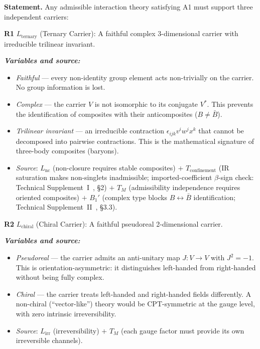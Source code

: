 \documentclass[11pt]{article}
\newenvironment{varlist}{\begin{itemize}[nosep,leftmargin=2em]}{\end{itemize}}
\begin{document}
\begin{tcolorbox}[apfbox, title={Theorem R: Representation Requirements from Admissibility}]
\textbf{Statement.}  Any admissible interaction theory satisfying A1 must support three independent carriers:

\medskip
\textbf{R1} $L_{\mathrm{ternary}}$ (Ternary Carrier): A faithful complex 3-dimensional carrier with irreducible trilinear invariant.

\smallskip\noindent\textbf{\textit{Variables and source:}}
\begin{varlist}
\item \textit{Faithful} --- every non-identity group element acts non-trivially on the carrier.  No group information is lost.
\item \textit{Complex} --- the carrier $V$ is not isomorphic to its conjugate $V^*$.  This prevents the identification of composites with their anticomposites ($B \ne \bar{B}$).
\item \textit{Trilinear invariant} --- an irreducible contraction $\epsilon_{ijk} v^i w^j x^k$ that cannot be decomposed into pairwise contractions.  This is the mathematical signature of three-body composites (baryons).
\item \textit{Source}: $L_{\mathrm{nc}}$ (non-closure requires stable composites) $+$ $T_{\mathrm{confinement}}$ (IR saturation makes non-singlets inadmissible; imported-coefficient $\beta$-sign check: Technical Supplement~I~\cite{BrookeP2Supplement}, \S2) $+$ $T_M$ (admissibility independence requires oriented composites) $+$ $B_1'$ (complex type blocks $B \leftrightarrow \bar{B}$ identification; Technical Supplement~II~\cite{BrookeP2FoundSupplement}, \S3.3).
\end{varlist}

\medskip
\textbf{R2} $L_{\mathrm{chiral}}$ (Chiral Carrier): A faithful pseudoreal 2-dimensional carrier.

\smallskip\noindent\textbf{\textit{Variables and source:}}
\begin{varlist}
\item \textit{Pseudoreal} --- the carrier admits an anti-unitary map $J: V \to V$ with $J^2 = -1$.  This is orientation-asymmetric: it distinguishes left-handed from right-handed without being fully complex.
\item \textit{Chiral} --- the carrier treats left-handed and right-handed fields differently.  A non-chiral (``vector-like'') theory would be CPT-symmetric at the gauge level, with zero intrinsic irreversibility.
\item \textit{Source}: $L_{\mathrm{irr}}$ (irreversibility) $+$ $T_M$ (each gauge factor must provide its own irreversible channels).
\end{varlist}


\end{tcolorbox}
\end{document}
